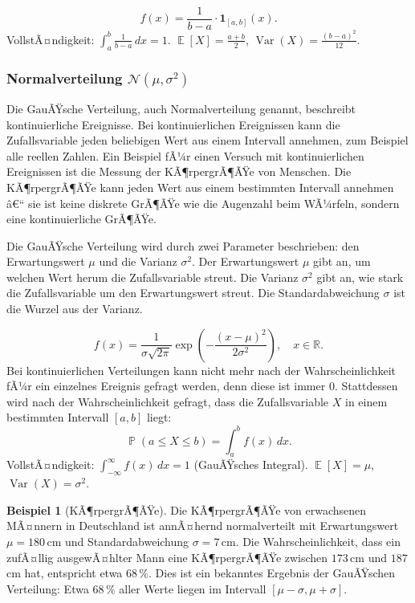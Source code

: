 ﻿\documentclass[12pt,a4paper]{article}
\theoremstyle{definition}
\newtheorem{beispiel}{Beispiel}[section]
\theoremstyle{plain}
\theoremstyle{remark}
\DeclareMathOperator{\E}{\mathbb{E}}
\DeclareMathOperator{\Var}{Var}
\DeclareMathOperator{\Prob}{\mathbb{P}}
\begin{document}
\[
  f(x) = \frac{1}{b-a} \cdot \mathbf{1}_{[a,b]}(x).
\]
VollstÃ¤ndigkeit: $\int_a^b \frac{1}{b-a}\,dx = 1$.
$\E[X] = \frac{a+b}{2}$, $\Var(X) = \frac{(b-a)^2}{12}$.

\subsubsection{Normalverteilung $\mathcal{N}(\mu, \sigma^2)$}

Die GauÃŸsche Verteilung, auch Normalverteilung genannt, beschreibt
kontinuierliche Ereignisse. Bei kontinuierlichen Ereignissen kann die
Zufallsvariable jeden beliebigen Wert aus einem Intervall annehmen, zum
Beispiel alle reellen Zahlen. Ein Beispiel fÃ¼r einen Versuch mit
kontinuierlichen Ereignissen ist die Messung der KÃ¶rpergrÃ¶ÃŸe von Menschen.
Die KÃ¶rpergrÃ¶ÃŸe kann jeden Wert aus einem bestimmten Intervall annehmen â€“
sie ist keine diskrete GrÃ¶ÃŸe wie die Augenzahl beim WÃ¼rfeln, sondern eine
kontinuierliche GrÃ¶ÃŸe.

Die GauÃŸsche Verteilung wird durch zwei Parameter beschrieben: den
Erwartungswert $\mu$ und die Varianz $\sigma^2$. Der Erwartungswert $\mu$
gibt an, um welchen Wert herum die Zufallsvariable streut. Die Varianz
$\sigma^2$ gibt an, wie stark die Zufallsvariable um den Erwartungswert
streut. Die Standardabweichung $\sigma$ ist die Wurzel aus der Varianz.

\[
  f(x) = \frac{1}{\sigma\sqrt{2\pi}}
  \exp\!\left(-\frac{(x-\mu)^2}{2\sigma^2}\right), \quad x \in \mathbb{R}.
\]
Bei kontinuierlichen Verteilungen kann nicht mehr nach der Wahrscheinlichkeit
fÃ¼r ein einzelnes Ereignis gefragt werden, denn diese ist immer $0$. Stattdessen
wird nach der Wahrscheinlichkeit gefragt, dass die Zufallsvariable $X$ in
einem bestimmten Intervall $[a, b]$ liegt:
\[
  \Prob(a \le X \le b) = \int_a^b f(x)\,dx.
\]
VollstÃ¤ndigkeit: $\int_{-\infty}^{\infty} f(x)\,dx = 1$ (GauÃŸsches Integral).
$\E[X] = \mu$, $\Var(X) = \sigma^2$.

\begin{beispiel}[KÃ¶rpergrÃ¶ÃŸe]\label{bsp:koerpergroesse}
  Die KÃ¶rpergrÃ¶ÃŸe von erwachsenen MÃ¤nnern in Deutschland ist annÃ¤hernd
  normalverteilt mit Erwartungswert $\mu = 180$\,cm und Standardabweichung
  $\sigma = 7$\,cm. Die Wahrscheinlichkeit, dass ein zufÃ¤llig ausgewÃ¤hlter
  Mann eine KÃ¶rpergrÃ¶ÃŸe zwischen $173$\,cm und $187$\,cm hat, entspricht
  etwa $68\,\%$. Dies ist ein bekanntes Ergebnis der GauÃŸschen Verteilung:
  Etwa $68\,\%$ aller Werte liegen im Intervall $[\mu - \sigma, \mu +
  \sigma]$.
\end{beispiel}
\end{document}
